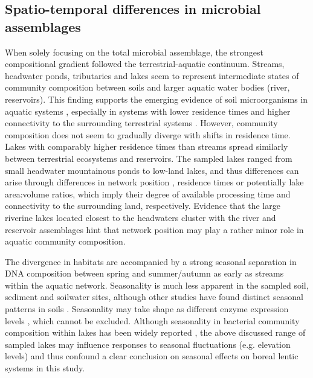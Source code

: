 \documentclass[12pt,a4paper]{article} %
\begin{document}
\subsection*{Spatio-temporal differences in microbial assemblages}
When solely focusing on the total microbial assemblage, the strongest compositional gradient followed the terrestrial-aquatic continuum. Streams, headwater ponds, tributaries and lakes seem to represent intermediate states of community composition between soils and larger aquatic water bodies (river, reservoirs). This finding supports the emerging evidence of soil microorganisms in aquatic systems \citep{Ruiz-Gonzalez2015, Hauptmann2016}, especially in systems with lower residence times and higher connectivity to the surrounding terrestrial systems \citep{Crump2012, Besemer2013}. However, community composition does not seem to gradually diverge with shifts in residence time. Lakes with comparably higher residence times than streams spread similarly between terrestrial ecosystems and reservoirs. The sampled lakes ranged from small headwater mountainous ponds to low-land lakes, and thus differences can arise through differences in network position \citep{Carrara2013}, residence times \citep{Logue2010} or potentially lake area:volume ratios, which imply their degree of available processing time and connectivity to the surrounding land, respectively. Evidence that the large riverine lakes located closest to the headwaters cluster with the river and reservoir assemblages hint that network position may play a rather minor role in aquatic community composition.

The divergence in habitats are accompanied by a strong seasonal separation in DNA composition between spring and summer/autumn as early as streams within the aquatic network. Seasonality is much less apparent in the sampled soil, sediment and soilwater sites, although other studies have found distinct seasonal patterns in soils \citep{Shigyo2019, Rasche2011c}. Seasonality may take shape as different enzyme expression levels \citep{Kaiser2010c}, which cannot be excluded. Although seasonality in bacterial community composition within lakes has been widely reported \citep{Crump2003, Kara2013, Nino-Garcia2017a}, the above discussed range of sampled lakes may influence responses to seasonal fluctuations (e.g. elevation levels) and thus confound a clear conclusion on seasonal effects on boreal lentic systems in this study.
\end{document}
